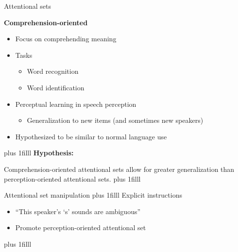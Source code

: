 \documentclass{beamer}
\newcommand{\btVFill}{\vskip0pt plus 1filll}
\begin{document}
\begin{frame}{Attentional sets}

\textbf{Comprehension-oriented}
\begin{itemize}
\item Focus on comprehending meaning
\item Tasks
\begin{itemize}
\item Word recognition
\item Word identification
\end{itemize}
\item Perceptual learning in speech perception
\begin{itemize}
\item Generalization to new items (and sometimes new speakers)
\end{itemize}
\item Hypothesized to be similar to normal language use
\end{itemize}

\btVFill
\textbf{Hypothesis:}

Comprehension-oriented attentional sets allow for greater generalization than perception-oriented attentional sets.
\btVFill
\begin{flushright}
\scriptsize
\citet{Norris2003, Kraljic2005, Pitt2012, Reinisch2013}
\end{flushright}

\end{frame}

\begin{frame}{Attentional set manipulation}
\btVFill
Explicit instructions
\begin{itemize}
\item ``This speaker's `s' sounds are ambiguous''
\item Promote perception-oriented attentional set
\end{itemize}

\btVFill
\begin{flushright}
\scriptsize
\citet{Pitt2012}
\end{flushright}
\end{frame}
\end{document}
